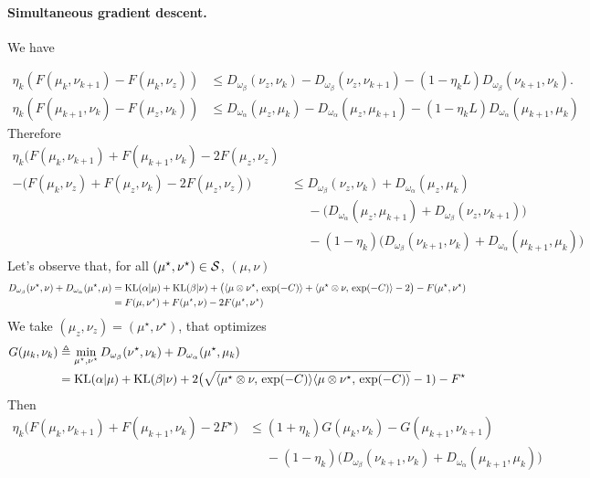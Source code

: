 \documentclass[a4paper, 10pt]{article}
\begin{document}
\paragraph{Simultaneous gradient descent.} We have

\begin{align}
    \eta_k (F(\mu_k,\nu_{k+1}) - F(\mu_k, \nu_z)) &\leq 
    D_{\omega_\beta}(\nu_z, \nu_k) - D_{\omega_\beta}(\nu_z, \nu_{k+1}) 
    - (1 - \eta_k L) D_{\omega_\beta}(\nu_{k+1}, \nu_k). \\
    \eta_k (F(\mu_{k+1},\nu_k) - F(\mu_z, \nu_k)) &\leq 
    D_{\omega_\alpha}(\mu_z, \mu_k) - D_{\omega_\alpha}(\mu_z, \mu_{k+1}) 
    - (1 - \eta_k L) D_{\omega_\alpha}(\mu_{k+1}, \mu_k)
\end{align}
Therefore
\begin{align}
    \eta_k \big(F(\mu_k,\nu_{k+1}) + F(\mu_{k+1},\nu_k) - 2 F(\mu_z, \nu_z) \\
     - ( F(\mu_k, \nu_z) + F(\mu_z, \nu_k) - 2 F(\mu_z, \nu_z)\big)
      &\leq 
    D_{\omega_\beta}(\nu_z, \nu_k) + D_{\omega_\alpha}(\mu_z, \mu_k) \\
    &\phantom{=}- \big(D_{\omega_\alpha}(\mu_z, \mu_{k+1})
     + D_{\omega_\beta}(\nu_z, \nu_{k+1})\big) \\
     &\phantom{=}
    - (1 - \eta_k) 
    \big(D_{\omega_\beta}(\nu_{k+1}, \nu_k) + D_{\omega_\alpha}(\mu_{k+1}, \mu_k)\big)
\end{align}
Let's observe that, for all $(\mu^\star, \nu^\star) \in \mathcal{S}$, $(\mu,\nu)$
\begin{align}
    D_{\omega_\beta}
    (\nu^\star, \nu) + D_{\omega_\alpha}(\mu^\star, \mu)
    &= \text{KL}(\alpha|\mu) + \text{KL}(\beta|\nu) 
    + \big(\langle \mu \otimes\nu^\star,\,\exp(-C)\rangle
     +\langle \mu^\star \otimes\nu,\,\exp(-C)\rangle - 2\big) - F(\mu^\star, \nu^\star) \\
     &= F(\mu, \nu^\star) + F(\mu^\star, \nu) - 2 F(\mu^\star, \nu^\star)
\end{align}
We take $(\mu_z,\nu_z) = (\mu^\star,\nu^\star)$, that optimizes
\begin{align}
    G(\mu_k, \nu_k) &\triangleq \min_{\mu^\star, \nu^\star} D_{\omega_\beta}
    (\nu^\star, \nu_k) + D_{\omega_\alpha}(\mu^\star, \mu_k) \\
    &= \text{KL}(\alpha|\mu) + \text{KL}(\beta|\nu) 
    + 2 \big( \sqrt{\langle \mu^\star \otimes \nu,\,\exp(-C)\rangle 
    \langle \mu \otimes \nu^\star,\,\exp(-C)\rangle} - 1) - 
    F^\star
\end{align}
Then
\begin{align}
    \eta_k \big(F(\mu_k,\nu_{k+1}) + F(\mu_{k+1},\nu_k) - 2 F^\star)
     &\leq 
    (1 + \eta_k) G(\mu_k, \nu_k) - G(\mu_{k+1}, \nu_{k+1}) \\
    &\phantom{=}
    - (1 - \eta_k) 
    \big(D_{\omega_\beta}(\nu_{k+1}, \nu_k) + D_{\omega_\alpha}(\mu_{k+1}, \mu_k)\big)    
\end{align}
\end{document}
